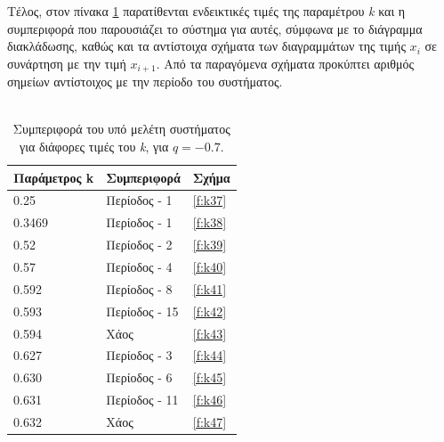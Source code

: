 Τέλος, στον πίνακα \ref{tab:abc3} παρατίθενται ενδεικτικές τιμές της παραμέτρου \emph{k} και η συμπεριφορά που παρουσιάζει το σύστημα για αυτές, σύμφωνα με το διάγραμμα διακλάδωσης, καθώς και τα αντίστοιχα σχήματα των διαγραμμάτων της τιμής \(x_i\) σε συνάρτηση με την τιμή \(x_{i+1}\). Από τα παραγόμενα σχήματα προκύπτει αριθμός σημείων αντίστοιχος με την περίοδο του συστήματος.\\\\

\begin{table}[ht]
	\centering
	\caption{ Συμπεριφορά του υπό μελέτη συστήματος για διάφορες τιμές του \emph{k}, για $q=-0.7$.}
	\label{tab:abc3}
	\begin{tabular}{l | l | l}
		Παράμετρος k & Συμπεριφορά & Σχήμα\\
		\hline
		0.25 &  Περίοδος -  1 & \ref{f:k37}\\
		0.3469&  Περίοδος -  1 & \ref{f:k38}\\
		0.52& Περίοδος -  2 & \ref{f:k39}\\
		0.57& Περίοδος -  4 & \ref{f:k40}\\
		0.592 &  Περίοδος -  8 & \ref{f:k41}\\
		0.593& Περίοδος -  15 & \ref{f:k42}\\
		0.594 & Χάος & \ref{f:k43}\\
		0.627 & Περίοδος -  3 & \ref{f:k44}\\
		0.630 & Περίοδος -  6 & \ref{f:k45}\\
		0.631 & Περίοδος -  11 & \ref{f:k46}\\
		0.632 & Χάος & \ref{f:k47}\\
	\end{tabular}
	
\end{table}

